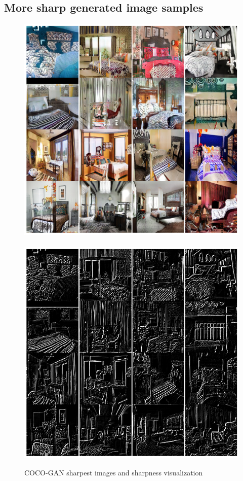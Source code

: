 \documentclass{article}
\begin{document}
    \subsection{More sharp generated image samples}
       \begin{figure}[H]
          \centering
          \includegraphics[scale=0.28]{sharpness-images/moresharpness_coco.png}
          \ \ 
          \includegraphics[scale=0.28]{sharpness-images/moresharpness_lines_coco.png}\\
          \caption{COCO-GAN sharpest images and sharpness visualization}
        \end{figure}
\end{document}
